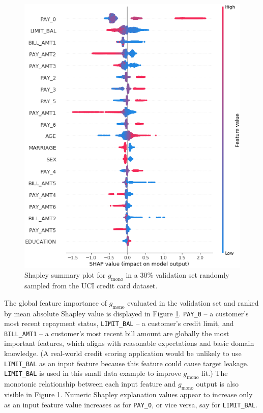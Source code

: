 \documentclass[sigconf, review]{acmart}
\begin{document}
\begin{figure}[htb]
	\begin{center}
		\includegraphics[scale=0.4]{img/figure_7.eps}
		\caption{Shapley summary plot for $g_{\text{mono}}$ in a 30\% validation set randomly sampled from the UCI credit card dataset.}
		\label{fig:cc_global_shapley}
	\end{center}
\end{figure}

The global feature importance of $g_{\text{mono}}$ evaluated in the validation set and ranked by mean absolute Shapley value is displayed in Figure \ref{fig:cc_global_shapley}. \texttt{PAY\_0} -- a customer's most recent repayment status, \texttt{LIMIT\_BAL} -- a customer's credit limit, and \texttt{BILL\_AMT1} -- a customer's most recent bill amount are globally the most important features, which aligns with reasonable expectations and basic domain knowledge. (A real-world credit scoring application would be unlikely to use \texttt{LIMIT\_BAL} as an input feature because this feature could cause target leakage. \texttt{LIMIT\_BAL} is used in this small data example to improve $g_{\text{mono}}$ fit.) The monotonic relationship between each input feature and $g_{\text{mono}}$ output is also visible in Figure \ref{fig:cc_global_shapley}. Numeric Shapley explanation values appear to increase only as an input feature value increases as for \texttt{PAY\_0}, or vice versa, say for \texttt{LIMIT\_BAL}. 
\end{document}
